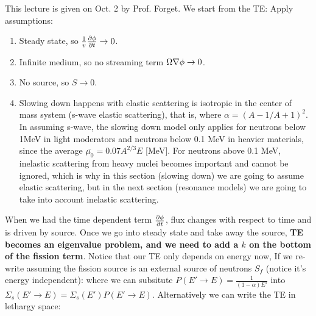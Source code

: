 \documentclass{school-22.211-notes}
\begin{document}
\clearpage
{}
This lecture is given on Oct. 2 by Prof. Forget. We start from the TE: 
Apply assumptions:
\begin{enumerate}
\item Steady state, so $\frac{1}{v} \frac{\partial \phi}{\partial t} \to 0$. 
\item Infinite medium, so no streaming term $\Omega \nabla \phi \to 0$. 
\item No source, so $S \to 0$. 
\item Slowing down happens with elastic scattering is isotropic in the center of mass system (s-wave elastic scattering), that is, 
  where $\alpha = (A-1/A+1)^2$. In assuming s-wave, the slowing down model only applies for neutrons below 1MeV in light moderators and neutrons below 0.1 MeV in heavier materials, since the average $\bar{\mu_0} = 0.07 A^{2/3}E$ [MeV].  For neutrons above 0.1 MeV, inelastic scattering from heavy nuclei becomes important and cannot be ignored, which is why in this section (slowing down) we are going to assume elastic scattering, but in the next section (resonance models) we are going to take into account inelastic scattering. 
\end{enumerate}

When we had the time dependent term $\frac{\partial \phi}{\partial t}$, flux changes with respect to time and is driven by source. Once we go into steady state and take away the source, \textbf{TE becomes an eigenvalue problem, and we need to add a $k$ on the bottom of the fission term}. Notice that our TE only depends on energy now,  
If we re-write assuming the fission source is an external source of neutrons $S_f$ (notice it's energy independent): 
where we can subsitute $P(E'\to E) = \frac{1}{(1-\alpha)E'}$ into $\Sigma_s(E' \to E) = \Sigma_s(E') P(E' \to E)$. Alternatively we can write the TE in lethargy space: 
\end{document}
